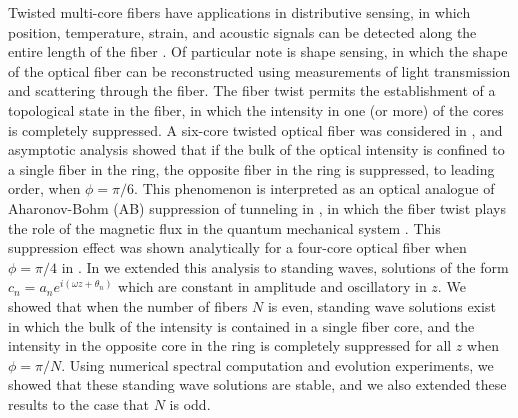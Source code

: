 \documentclass[11pt,reqno]{amsart}
\begin{document}
Twisted multi-core fibers have applications in distributive sensing, in which position, temperature, strain, and acoustic signals can be detected along the entire length of the fiber \cite{Gannot2014,Westbrook2017}. Of particular note is shape sensing, in which the shape of the optical fiber can be reconstructed using measurements of light transmission and scattering through the fiber. The fiber twist permits the establishment of a topological state in the fiber, in which the intensity in one (or more) of the cores is completely suppressed. A six-core twisted optical fiber was considered in \cite{castro2016}, and asymptotic analysis showed that if the bulk of the optical intensity is confined to a single fiber in the ring, the opposite fiber in the ring is suppressed, to leading order, when $\phi = \pi/6$. This phenomenon is interpreted as an optical analogue of Aharonov-Bohm (AB) suppression of tunneling in \cite{Ornigotti2007,Parto2017,Parto2019}, in which the fiber twist plays the role of the magnetic flux in the quantum mechanical system \cite{Loss1992}. This suppression effect was shown analytically for a four-core optical fiber when $\phi=\pi/4$ in \cite{Parto2019}. In \cite{parker2021} we extended this analysis to standing waves, solutions of the form $c_n = a_n e^{i (\omega z + \theta_n) }$ which are constant in amplitude and oscillatory in $z$. We showed that when the number of fibers $N$ is even, standing wave solutions exist in which the bulk of the intensity is contained in a single fiber core, and the intensity in the opposite core in the ring is completely suppressed for all $z$ when $\phi = \pi/N$. Using numerical spectral computation and evolution experiments, we showed that these standing wave solutions are stable, and we also extended these results to the case that $N$ is odd.
\end{document}
